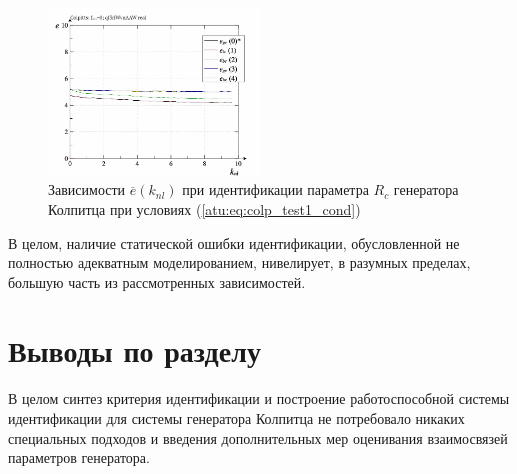 \begin{figure}[htb!]
  \centerline{\includegraphics[width=0.50\textwidth]{p/r/colp_real_id-p_k_nl_d_0.png} }
  \caption{Зависимости $\overline{e}(k_{nl})$ при идентификации параметра $R_c$ генератора Колпитца при условиях (\ref{atu:eq:colp_test1_cond})}
  \label{atu:f:colp_real_id_p_k_nl_d_0}
\end{figure}
%
%

В целом, наличие статической ошибки идентификации,
обусловленной не полностью адекватным моделированием,
нивелирует, в разумных пределах,
большую часть из рассмотренных зависимостей.




\section{Выводы по разделу \thechapter}  %


В целом синтез критерия идентификации и построение работоспособной системы идентификации для
системы генератора Колпитца не потребовало никаких специальных подходов и введения дополнительных
мер оценивания взаимосвязей параметров генератора.


